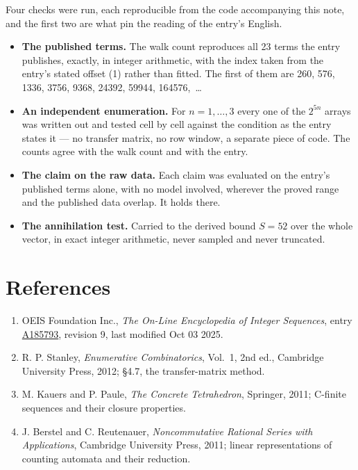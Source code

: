 \documentclass[11pt]{article}
\theoremstyle{definition}
\begin{document}
Four checks were run, each reproducible from the code accompanying this note, and the first two are what pin the reading of the entry's English.

\begin{itemize}

\item {\bfseries The published terms.} The walk count reproduces all 23 terms the entry publishes, exactly, in integer arithmetic, with the index taken from the entry's stated offset (1) rather than fitted. The first of them are 260, 576, 1336, 3756, 9368, 24392, 59944, 164576,~\dots

\item {\bfseries An independent enumeration.} For $n = 1,\dots,3$ every one of the $2^{5n}$ arrays was written out and tested cell by cell against the condition as the entry states it --- no transfer matrix, no row window, a separate piece of code. The counts agree with the walk count and with the entry.

\item {\bfseries The claim on the raw data.} Each claim was evaluated on the entry's published terms alone, with no model involved, wherever the proved range and the published data overlap. It holds there.

\item {\bfseries The annihilation test.} Carried to the derived bound $S = 52$ over the whole vector, in exact integer arithmetic, never sampled and never truncated.

\end{itemize}

\section{References}

\begin{enumerate}

\item OEIS Foundation Inc., \emph{The On-Line Encyclopedia of Integer Sequences}, entry \href{https://oeis.org/A185793}{A185793}, revision 9, last modified Oct 03 2025.

\item R. P. Stanley, \emph{Enumerative Combinatorics}, Vol.~1, 2nd ed., Cambridge University Press, 2012; \S4.7, the transfer-matrix method.

\item M. Kauers and P. Paule, \emph{The Concrete Tetrahedron}, Springer, 2011; C-finite sequences and their closure properties.

\item J. Berstel and C. Reutenauer, \emph{Noncommutative Rational Series with Applications}, Cambridge University Press, 2011; linear representations of counting automata and their reduction.

\end{enumerate}
\end{document}
